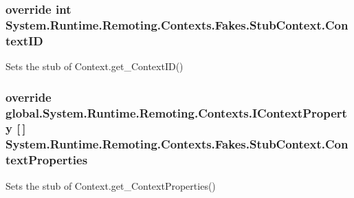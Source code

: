 \hypertarget{class_system_1_1_runtime_1_1_remoting_1_1_contexts_1_1_fakes_1_1_stub_context_a47b8f3f5557e198d9c277ef1a1e0b846}{
\subsubsection[{Context\-I\-D}]{\setlength{\rightskip}{0pt plus 5cm}override int System.\-Runtime.\-Remoting.\-Contexts.\-Fakes.\-Stub\-Context.\-Context\-I\-D\hspace{0.3cm}{\ttfamily [get]}}}\label{class_system_1_1_runtime_1_1_remoting_1_1_contexts_1_1_fakes_1_1_stub_context_a47b8f3f5557e198d9c277ef1a1e0b846}


Sets the stub of Context.\-get\-\_\-\-Context\-I\-D()

\hypertarget{class_system_1_1_runtime_1_1_remoting_1_1_contexts_1_1_fakes_1_1_stub_context_a9aba568196e23e78c01f70603a5c84a2}{
\subsubsection[{Context\-Properties}]{\setlength{\rightskip}{0pt plus 5cm}override global.\-System.\-Runtime.\-Remoting.\-Contexts.\-I\-Context\-Property \mbox{[}$\,$\mbox{]} System.\-Runtime.\-Remoting.\-Contexts.\-Fakes.\-Stub\-Context.\-Context\-Properties\hspace{0.3cm}{\ttfamily [get]}}}\label{class_system_1_1_runtime_1_1_remoting_1_1_contexts_1_1_fakes_1_1_stub_context_a9aba568196e23e78c01f70603a5c84a2}


Sets the stub of Context.\-get\-\_\-\-Context\-Properties()

